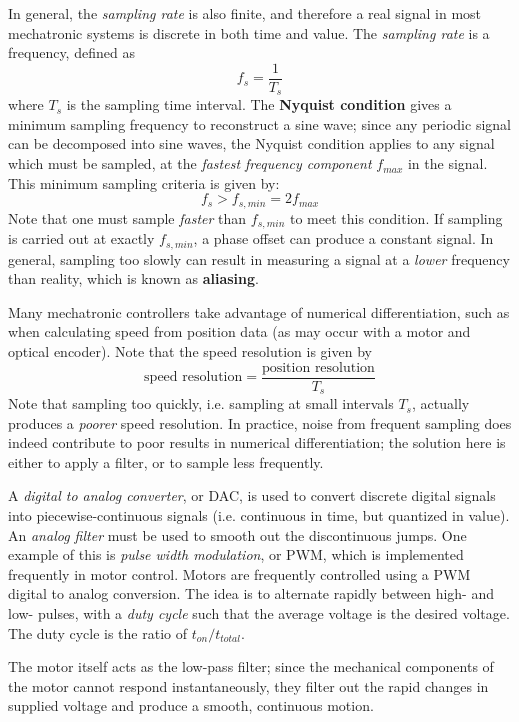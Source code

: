 In general, the \textit{sampling rate} is also finite, and therefore a real signal in most mechatronic systems is discrete in both time and value. The \textit{sampling rate} is a frequency, defined as \[f_s = \frac{1}{T_s}\] where $T_s$ is the sampling time interval. The \textbf{Nyquist condition} gives a minimum sampling frequency to reconstruct a sine wave; since any periodic signal can be decomposed into sine waves, the Nyquist condition applies to any signal which must be sampled, at the \textit{fastest frequency component} $f_{max}$ in the signal. This minimum sampling criteria is given by: \[f_s > f_{s,min} = 2f_{max} \tag{Nyquist Frequency}\] Note that one must sample \textit{faster} than $f_{s,min}$ to meet this condition. If sampling is carried out at exactly $f_{s,min}$, a phase offset can produce a constant signal. In general, sampling too slowly can result in measuring a signal at a \textit{lower} frequency than reality, which is known as \textbf{aliasing}.

Many mechatronic controllers take advantage of numerical differentiation, such as when calculating speed from position data (as may occur with a motor and optical encoder). Note that the speed resolution is given by \[\text{speed resolution} = \frac{\text{position resolution}}{T_s}\] Note that sampling too quickly, i.e. sampling at small intervals $T_s$, actually produces a \textit{poorer} speed resolution. In practice, noise from frequent sampling does indeed contribute to poor results in numerical differentiation; the solution here is either to apply a filter, or to sample less frequently.

A \textit{digital to analog converter}, or DAC, is used to convert discrete digital signals into piecewise-continuous signals (i.e. continuous in time, but quantized in value). An \textit{analog filter} must be used to smooth out the discontinuous jumps. One example of this is \textit{pulse width modulation}, or PWM, which is implemented frequently in motor control. Motors are frequently controlled using a PWM digital to analog conversion. The idea is to alternate rapidly between high- and low- pulses, with a \textit{duty cycle} such that the average voltage is the desired voltage. The duty cycle is the ratio of $t_{on}/t_{total}$.

The motor itself acts as the low-pass filter; since the mechanical components of the motor cannot respond instantaneously, they filter out the rapid changes in supplied voltage and produce a smooth, continuous motion.

